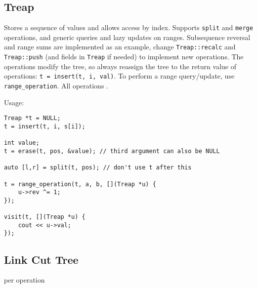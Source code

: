 \subsection{Treap}

Stores a sequence of values and allows access by index. Supports \texttt{split} and \texttt{merge} operations, and generic queries and lazy updates on ranges. Subsequence reversal and range sums are implemented as an example, change \texttt{Treap::recalc} and \texttt{Treap::push} (and fields in \texttt{Treap} if needed) to implement new operations.
The operations modify the tree, so always reassign the tree to the return value of operations: \texttt{t = insert(t, i, val)}. To perform a range query/update, use \texttt{range\_operation}.
All operations .

Usage:
\begin{lstlisting}
Treap *t = NULL;
t = insert(t, i, s[i]);

int value;
t = erase(t, pos, &value); // third argument can also be NULL

auto [l,r] = split(t, pos); // don't use t after this

t = range_operation(t, a, b, [](Treap *u) {
	u->rev ^= 1;
});

visit(t, [](Treap *u) {
	cout << u->val;
});
\end{lstlisting}



\subsection{Link Cut Tree}
 per operation

